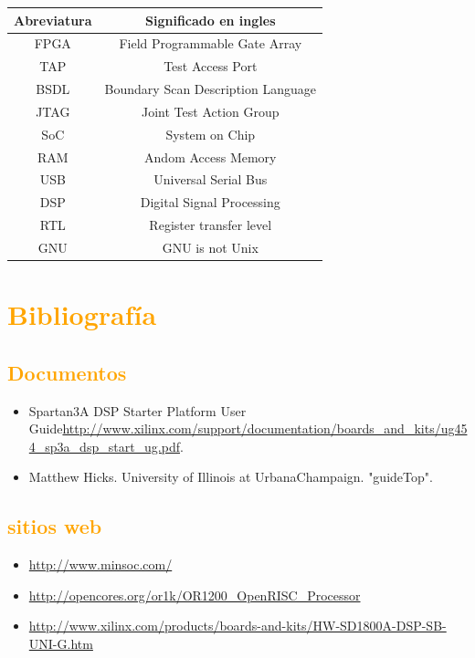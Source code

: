 \documentclass[a4paper,11pt]{article}
\begin{document}
\begin{table}[!h]
\begin{center}
\begin{tabular}{|c|c|}
\hline
\rowcolor[RGB]{255,127,0} Abreviatura & Significado en ingles \\
\hline
FPGA & Field Programmable Gate Array  \\
\hline
TAP & Test Access Port  \\
\hline
\hline
BSDL & Boundary Scan Description Language  \\
\hline
\hline
JTAG & Joint Test Action Group  \\
\hline
\hline
SoC & System on Chip\\
\hline
\hline
RAM & Andom Access Memory \\
\hline
\hline
USB & Universal Serial Bus  \\
\hline
\hline
DSP& Digital Signal Processing \\
\hline
\hline
RTL & Register transfer level \\
\hline
\hline
GNU & GNU is not Unix\\
\hline
\end{tabular}
\end{center}
\end{table}

\newpage

\section{\textcolor{orange}{Bibliografía}}
\subsection{\textcolor{orange}{Documentos}}
\begin{itemize}
\item Spartan\-3A DSP Starter Platform User Guide\url{http://www.xilinx.com/support/documentation/boards_and_kits/ug454_sp3a_dsp_start_ug.pdf}.
\item Matthew Hicks. University of Illinois at Urbana\-Champaign. "guideTop".  
\end{itemize} 
\subsection{\textcolor{orange}{sitios web}}
\begin{itemize}
\item \url{http://www.minsoc.com/}
\item \url{http://opencores.org/or1k/OR1200_OpenRISC_Processor}
\item\url{http://www.xilinx.com/products/boards-and-kits/HW-SD1800A-DSP-SB-UNI-G.htm}

\end{itemize} 
\end{document}
